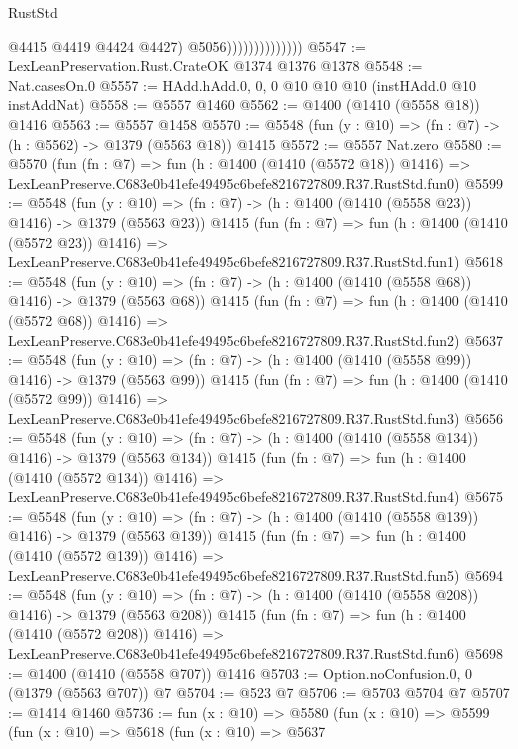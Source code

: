 \begin{lexlean}{RustStd}
\begin{coremodule}
                                  @4415
                                  @4419
                                  @4424
                                  @4427)
                                @5056))))))))))))))
@5547 := LexLeanPreservation.Rust.CrateOK @1374 @1376 @1378
@5548 := Nat.casesOn.{0}
@5557 := HAdd.hAdd.{0, 0, 0} @10 @10 @10 (instHAdd.{0} @10 instAddNat)
@5558 := @5557 @1460
@5562 := @1400 (@1410 (@5558 @18)) @1416
@5563 := @5557 @1458
@5570 := @5548 (fun (y : @10) => (fn : @7) -> (h : @5562) -> @1379 (@5563 @18)) @1415
@5572 := @5557 Nat.zero
@5580 := @5570
    (fun (fn : @7) =>
    fun (h : @1400 (@1410 (@5572 @18)) @1416) =>
    LexLeanPreserve.C683e0b41efe49495c6befe8216727809.R37.RustStd.fun0)
@5599 := @5548
    (fun (y : @10) => (fn : @7) -> (h : @1400 (@1410 (@5558 @23)) @1416) -> @1379 (@5563 @23))
    @1415
    (fun (fn : @7) =>
    fun (h : @1400 (@1410 (@5572 @23)) @1416) =>
    LexLeanPreserve.C683e0b41efe49495c6befe8216727809.R37.RustStd.fun1)
@5618 := @5548
    (fun (y : @10) => (fn : @7) -> (h : @1400 (@1410 (@5558 @68)) @1416) -> @1379 (@5563 @68))
    @1415
    (fun (fn : @7) =>
    fun (h : @1400 (@1410 (@5572 @68)) @1416) =>
    LexLeanPreserve.C683e0b41efe49495c6befe8216727809.R37.RustStd.fun2)
@5637 := @5548
    (fun (y : @10) => (fn : @7) -> (h : @1400 (@1410 (@5558 @99)) @1416) -> @1379 (@5563 @99))
    @1415
    (fun (fn : @7) =>
    fun (h : @1400 (@1410 (@5572 @99)) @1416) =>
    LexLeanPreserve.C683e0b41efe49495c6befe8216727809.R37.RustStd.fun3)
@5656 := @5548
    (fun (y : @10) => (fn : @7) -> (h : @1400 (@1410 (@5558 @134)) @1416) -> @1379 (@5563 @134))
    @1415
    (fun (fn : @7) =>
    fun (h : @1400 (@1410 (@5572 @134)) @1416) =>
    LexLeanPreserve.C683e0b41efe49495c6befe8216727809.R37.RustStd.fun4)
@5675 := @5548
    (fun (y : @10) => (fn : @7) -> (h : @1400 (@1410 (@5558 @139)) @1416) -> @1379 (@5563 @139))
    @1415
    (fun (fn : @7) =>
    fun (h : @1400 (@1410 (@5572 @139)) @1416) =>
    LexLeanPreserve.C683e0b41efe49495c6befe8216727809.R37.RustStd.fun5)
@5694 := @5548
    (fun (y : @10) => (fn : @7) -> (h : @1400 (@1410 (@5558 @208)) @1416) -> @1379 (@5563 @208))
    @1415
    (fun (fn : @7) =>
    fun (h : @1400 (@1410 (@5572 @208)) @1416) =>
    LexLeanPreserve.C683e0b41efe49495c6befe8216727809.R37.RustStd.fun6)
@5698 := @1400 (@1410 (@5558 @707)) @1416
@5703 := Option.noConfusion.{0, 0} (@1379 (@5563 @707)) @7
@5704 := @523 @7
@5706 := @5703 @5704 @7
@5707 := @1414 @1460
@5736 := fun (x : @10) =>
  @5580
    (fun (x : @10) =>
    @5599
      (fun (x : @10) =>
      @5618
        (fun (x : @10) =>
        @5637

\end{coremodule}
\end{lexlean}

